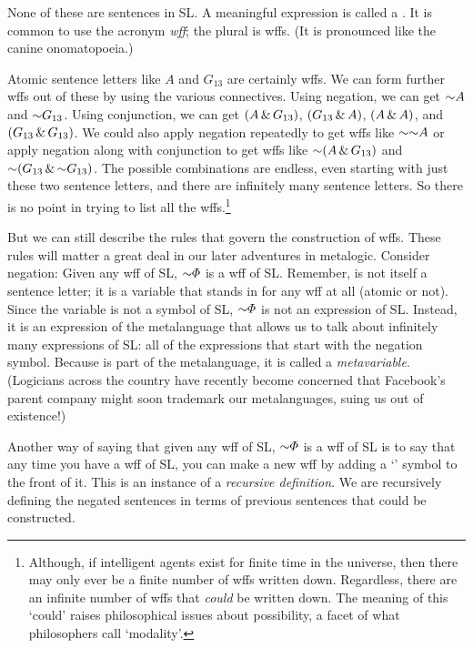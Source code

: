 None of these are sentences in SL. A meaningful expression is called a . It is common to use the acronym \emph{wff}; the plural is wffs. (It is pronounced like the canine onomatopoeia.)

Atomic sentence letters like $A$ and $G_{13}$ are certainly wffs. We can form further wffs out of these by using the various connectives. Using negation, we can get $\enot A$ and $\enot G_{13}$. Using conjunction, we can get $(A \,\&\, G_{13})$, $(G_{13} \,\&\, A)$, $(A \,\&\, A)$, and $(G_{13} \,\&\, G_{13})$. We could also apply negation repeatedly to get wffs like $\enot \enot A$ or apply negation along with conjunction to get wffs like $\enot(A \eand G_{13})$ and $\enot(G_{13} \eand \enot G_{13})$. The possible combinations are endless, even starting with just these two sentence letters, and there are infinitely many sentence letters. So there is no point in trying to list all the wffs.\footnote{{\color{black} Although, if intelligent agents exist for finite time in the universe, then there may only ever be a finite number of wffs written down. Regardless, there are an infinite number of wffs that \textit{could} be written down. The meaning of this `could' raises philosophical issues about possibility, a facet of what philosophers call `modality'.}} 

But we can still describe the rules that govern the construction of wffs. {\color{black}These rules will matter a great deal in our later adventures in metalogic.} Consider negation: Given any wff \metaA{} of SL, $\enot\metaA{}$ is a wff of SL. Remember, \metaA{} is not itself a sentence letter; it is a variable that stands in for any wff at all (atomic or not). Since the variable \metaA{} is not a symbol of SL, $\enot\metaA{}$ is not an expression of SL. Instead, it is an expression of the metalanguage that allows us to talk about infinitely many expressions of SL: all of the expressions that start with the negation symbol. Because \metaA{} is part of the metalanguage, it is called a \emph{metavariable}. {\color{black}(Logicians across the country have recently become concerned that Facebook's parent company might soon trademark our metalanguages, suing us out of existence!)}

Another way of saying that given any wff \metaA{} of SL, $\enot\metaA{}$ is a wff of SL is to say that any time you have a wff of SL, you can make a new wff by adding a `\enot' symbol to the front of it. {\color{black} This is an instance of a \textit{recursive definition}. We are recursively defining the negated sentences in terms of previous sentences that could be constructed.}


